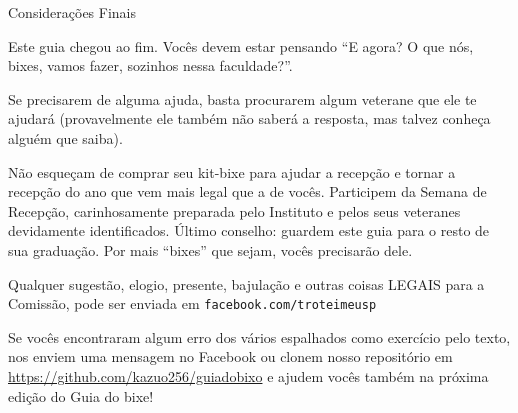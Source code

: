 \begin{secao}{Considerações Finais}

Este guia chegou ao fim. Vocês devem estar pensando ``E agora? O que nós, bixes,
vamos fazer, sozinhos nessa faculdade?''.

Se precisarem de alguma ajuda, basta procurarem algum veterane que ele te
ajudará (provavelmente ele também não saberá a resposta, mas talvez conheça alguém que saiba).

Não esqueçam de comprar seu kit-bixe para ajudar a recepção e tornar a recepção
do ano que vem mais legal que a de vocês. Participem da Semana de Recepção,
carinhosamente preparada pelo Instituto e pelos seus veteranes devidamente
identificados. Último conselho: guardem este guia para o resto de sua graduação.
Por mais ``bixes'' que sejam, vocês precisarão dele.

Qualquer sugestão, elogio, presente, bajulação e outras coisas LEGAIS para a
Comissão, pode ser enviada em {\tt facebook.com/troteimeusp}

Se vocês encontraram algum erro dos vários espalhados como exercício pelo texto,
nos enviem uma mensagem no Facebook ou clonem nosso repositório em
\url{https://github.com/kazuo256/guiadobixo} e ajudem vocês também na próxima
edição do Guia do bixe!

\end{secao}
